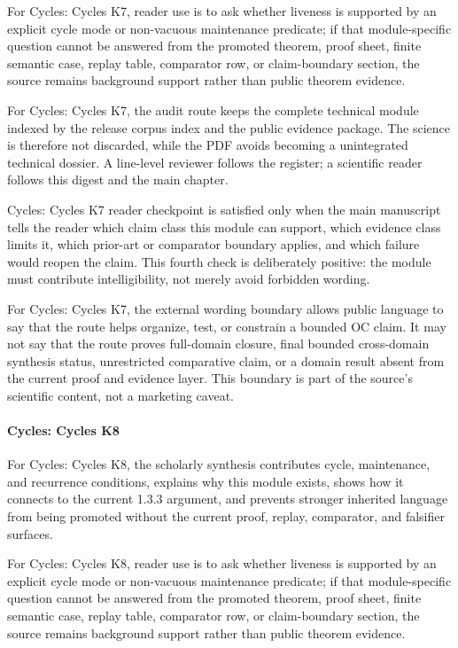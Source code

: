 For Cycles: Cycles K7, reader use is to ask whether liveness is supported by an explicit cycle mode or non-vacuous maintenance predicate; if that module-specific question cannot be answered from the promoted theorem, proof sheet, finite semantic case, replay table, comparator row, or claim-boundary section, the source remains background support rather than public theorem evidence.


For Cycles: Cycles K7, the audit route keeps the complete technical module indexed by the release corpus index and the public evidence package. The science is therefore not discarded, while the PDF avoids becoming a unintegrated technical dossier. A line-level reviewer follows the register; a scientific reader follows this digest and the main chapter.


Cycles: Cycles K7 reader checkpoint is satisfied only when the main manuscript tells the reader which claim class this module can support, which evidence class limits it, which prior-art or comparator boundary applies, and which failure would reopen the claim. This fourth check is deliberately positive: the module must contribute intelligibility, not merely avoid forbidden wording.


For Cycles: Cycles K7, the external wording boundary allows public language to say that the route helps organize, test, or constrain a bounded OC claim. It may not say that the route proves full-domain closure, final bounded cross-domain synthesis status, unrestricted comparative claim, or a domain result absent from the current proof and evidence layer. This boundary is part of the source's scientific content, not a marketing caveat.


\paragraph{Cycles: Cycles K8}

For Cycles: Cycles K8, the scholarly synthesis contributes cycle, maintenance, and recurrence conditions, explains why this module exists, shows how it connects to the current 1.3.3 argument, and prevents stronger inherited language from being promoted without the current proof, replay, comparator, and falsifier surfaces.


For Cycles: Cycles K8, reader use is to ask whether liveness is supported by an explicit cycle mode or non-vacuous maintenance predicate; if that module-specific question cannot be answered from the promoted theorem, proof sheet, finite semantic case, replay table, comparator row, or claim-boundary section, the source remains background support rather than public theorem evidence.


